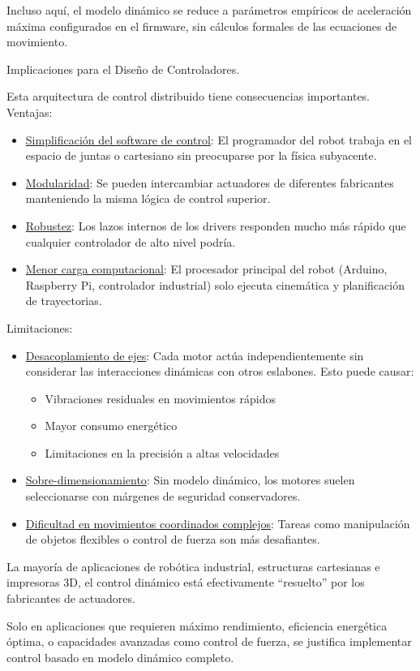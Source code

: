 Incluso aquí, el modelo dinámico se reduce a parámetros empíricos de aceleración máxima configurados en el firmware, sin cálculos formales de las ecuaciones de movimiento.

Implicaciones para el Diseño de Controladores.

Esta arquitectura de control distribuido tiene consecuencias importantes.\\

Ventajas:

\begin{itemize}[label=$\bullet$]
    \item \underline{Simplificación del software de control}: El programador del robot trabaja en el espacio de juntas o cartesiano sin preocuparse por la física subyacente.

    \item \underline{Modularidad}: Se pueden intercambiar actuadores de diferentes fabricantes manteniendo la misma lógica de control superior.

    \item \underline{Robustez}: Los lazos internos de los drivers responden mucho más rápido que cualquier controlador de alto nivel podría.

    \item \underline{Menor carga computacional}: El procesador principal del robot (Arduino, Raspberry Pi, controlador industrial) solo ejecuta cinemática y planificación de trayectorias.
\end{itemize}

Limitaciones:

\begin{itemize}[label=$\bullet$]
    \item \underline{Desacoplamiento de ejes}: Cada motor actúa independientemente sin considerar las interacciones dinámicas con otros eslabones. Esto puede causar:
    \begin{itemize}[label=$\bullet$]
        \item Vibraciones residuales en movimientos rápidos
        \item Mayor consumo energético
        \item Limitaciones en la precisión a altas velocidades
    \end{itemize}

    \item \underline{Sobre-dimensionamiento}: Sin modelo dinámico, los motores suelen seleccionarse con márgenes de seguridad conservadores.

    \item \underline{Dificultad en movimientos coordinados complejos}: Tareas como manipulación de objetos flexibles o control de fuerza son más desafiantes.
\end{itemize}

La mayoría de aplicaciones de robótica industrial, estructuras cartesianas e impresoras 3D, el control dinámico está efectivamente ``resuelto'' por los fabricantes de actuadores. 

Solo en aplicaciones que requieren máximo rendimiento, eficiencia energética óptima, o capacidades avanzadas como control de fuerza, se justifica implementar control basado en modelo dinámico completo.
